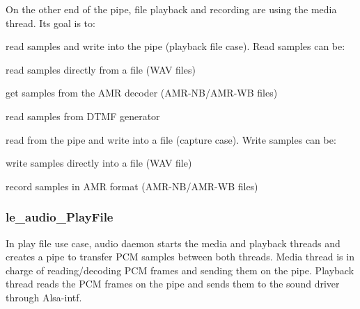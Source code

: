 On the other end of the pipe, file playback and recording are using the media thread. Its goal is to\+:
\begin{DoxyItemize}
\item read samples and write into the pipe (playback file case). Read samples can be\+:
\begin{DoxyItemize}
\item read samples directly from a file (W\+AV files)
\item get samples from the A\+MR decoder (A\+M\+R-\/\+N\+B/\+A\+M\+R-\/\+WB files)
\item read samples from D\+T\+MF generator
\end{DoxyItemize}
\item read from the pipe and write into a file (capture case). Write samples can be\+:
\begin{DoxyItemize}
\item write samples directly into a file (W\+AV file)
\item record samples in A\+MR format (A\+M\+R-\/\+N\+B/\+A\+M\+R-\/\+WB files)
\end{DoxyItemize}
\end{DoxyItemize}\hypertarget{c_SDD_audio_le_audio_PlayFile}{}\subsubsection{le\+\_\+audio\+\_\+\+Play\+File}\label{c_SDD_audio_le_audio_PlayFile}
In play file use case, audio daemon starts the media and playback threads and creates a pipe to transfer P\+CM samples between both threads. Media thread is in charge of reading/decoding P\+CM frames and sending them on the pipe. Playback thread reads the P\+CM frames on the pipe and sends them to the sound driver through Alsa-\/intf.


